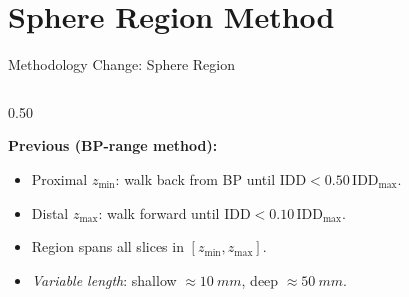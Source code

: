 \documentclass[aspectratio=169, 10pt]{beamer}
\begin{document}
\section{Sphere Region Method}

\begin{frame}{Methodology Change: Sphere Region}
  \begin{columns}[T]
    \begin{column}{0.50\textwidth}
      {\footnotesize
      \textbf{Previous (BP-range method):}
      \begin{itemize}\setlength{\itemsep}{0pt}\setlength{\parskip}{0pt}
        \item Proximal $z_{\min}$: walk back from BP until
              $\text{IDD} < 0.50\,\text{IDD}_{\max}$.
        \item Distal $z_{\max}$: walk forward until
              $\text{IDD} < 0.10\,\text{IDD}_{\max}$.
        \item Region spans all slices in $[z_{\min}, z_{\max}]$.
        \item \textit{Variable length}: shallow $\approx\SI{10}{mm}$,
              deep $\approx\SI{50}{mm}$.
      \end{itemize}

}
\end{column}
\end{columns}
\end{frame}
\end{document}
